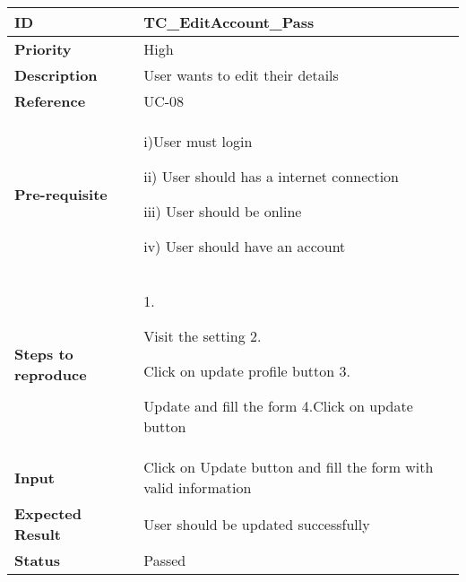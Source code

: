 \begin{center}
    \begin{tabularx}{\textwidth}{|l|X|}
        \hline
        \textbf{ID}                 & TC\_EditAccount\_Pass                                           \\
        \hline
        \textbf{Priority}           & High                                                            \\
        \hline
        \textbf{Description}        & User wants to edit their details                                \\
        \hline
        \textbf{Reference}          & UC-08                                                           \\
        \hline
        \textbf{Pre-requisite}      & i)User must login

        ii) User should has a internet connection

        iii) User should be online

        iv) User should have an account                                                               \\
        \hline
        \textbf{Steps to reproduce} & 1.

        Visit the setting 2.

        Click on update profile button 3.

        Update and fill the form 4.Click on update button                                             \\
        \hline
        \textbf{Input}              & Click on Update button and fill the form with valid information \\
        \hline
        \textbf{Expected Result}    & User should be updated successfully                             \\
        \hline
        \textbf{Status}             & Passed                                                          \\
        \hline
    \end{tabularx}
\end{center}
\vspace{5mm}




